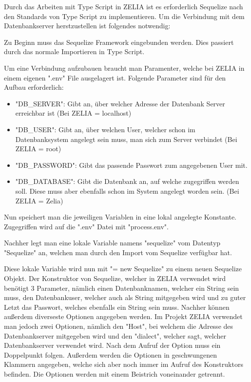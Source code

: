 
Durch das Arbeiten mit Type Script in ZELIA ist es erforderlich Sequelize nach den Standards von Type Script zu implementieren. Um die Verbindung mit dem Datenbankserver herstzustellen ist folgendes notwendig:

Zu Beginn muss das Sequelize Framework eingebunden werden. Dies passiert durch das normale Importieren in Type Script.


Um eine Verbindung aufzubauen braucht man Paramenter, welche bei ZELIA in einem eigenen ".env" File ausgelagert ist. Folgende Parameter sind für den Aufbau erforderlich:

\begin{itemize}
    \item "DB\_SERVER": Gibt an, über welcher Adresse der Datenbank Server erreichbar ist (Bei ZELIA = localhost)
    \item "DB\_USER": Gibt an, über welchen User, welcher schon im Datenbanksystem angelegt sein muss, man sich zum Server verbindet (Bei ZELIA = root)
    \item "DB\_PASSWORD": Gibt das passende Passwort zum angegebenen User mit.
    \item "DB\_DATABASE": Gibt die Datenbank an, auf welche zugegriffen werden soll. Diese muss aber ebenfalls schon im System angelegt worden sein. (Bei ZELIA = Zelia)
\end{itemize}

Nun speichert man die jeweiligen Variablen in eine lokal angelegte Konstante. Zugegriffen wird auf die ".env" Datei mit "process.env".


Nachher legt man eine lokale Variable namens "sequelize" vom Datentyp "Sequelize" an, welchen man durch den Import vom Sequelize verfügbar hat.


Diese lokale Variable wird nun mit "= new Sequelize" zu einem neuen Sequelize Objekt. Der Konstruktor von Sequelize, welcher in ZELIA verwendet wird benötigt 3 Parameter, nämlich einen Datenbanknamen, welcher ein String sein muss, den Datenbankuser, welcher auch als String mitgegeben wird und zu guter Letzt das Passwort, welches ebenfalls ein String sein muss. Nachher können außerdem diverseste Optionen angegeben werden. Im Projekt ZELIA verwendet man jedoch zwei Optionen, nämlich den "Host", bei welchem die Adresse des Datenbankserver mitgegeben wird und den "dialect", welcher sagt, welcher Datenbankserver verwendet wird. Nach dem Aufruf der Option muss ein Doppelpunkt folgen. Außerdem werden die Optionen in geschwungenen Klammern angegeben, welche sich aber noch immer im Aufruf des Konstruktors befinden. Die Optionen werden mit einem Beistrich voneinander getrennt.

